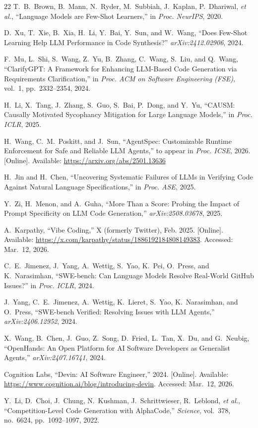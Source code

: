 \documentclass[conference]{IEEEtran}
\begin{document}
\begin{thebibliography}{22}
T.~B.~Brown, B.~Mann, N.~Ryder, M.~Subbiah, J.~Kaplan, P.~Dhariwal, \emph{et al.}, ``Language Models are Few-Shot Learners,'' in \emph{Proc. NeurIPS}, 2020.

D.~Xu, T.~Xie, B.~Xia, H.~Li, Y.~Bai, Y.~Sun, and W.~Wang, ``Does Few-Shot Learning Help LLM Performance in Code Synthesis?'' \emph{arXiv:2412.02906}, 2024.

F.~Mu, L.~Shi, S.~Wang, Z.~Yu, B.~Zhang, C.~Wang, S.~Liu, and Q.~Wang, ``ClarifyGPT: A Framework for Enhancing LLM-Based Code Generation via Requirements Clarification,'' in \emph{Proc. ACM on Software Engineering (FSE)}, vol.~1, pp.~2332--2354, 2024.

H.~Li, X.~Tang, J.~Zhang, S.~Guo, S.~Bai, P.~Dong, and Y.~Yu, ``CAUSM: Causally Motivated Sycophancy Mitigation for Large Language Models,'' in \emph{Proc. ICLR}, 2025.

H.~Wang, C.~M.~Poskitt, and J.~Sun, ``AgentSpec: Customizable Runtime Enforcement for Safe and Reliable LLM Agents,'' to appear in \emph{Proc. ICSE}, 2026. [Online]. Available: \url{https://arxiv.org/abs/2501.13636}

H.~Jin and H.~Chen, ``Uncovering Systematic Failures of LLMs in Verifying Code Against Natural Language Specifications,'' in \emph{Proc. ASE}, 2025.

Y.~Zi, H.~Menon, and A.~Guha, ``More Than a Score: Probing the Impact of Prompt Specificity on LLM Code Generation,'' \emph{arXiv:2508.03678}, 2025.

A.~Karpathy, ``Vibe Coding,'' X (formerly Twitter), Feb. 2025. [Online]. Available: \url{https://x.com/karpathy/status/1886192184808149383}. Accessed: Mar.~12, 2026.

C.~E.~Jimenez, J.~Yang, A.~Wettig, S.~Yao, K.~Pei, O.~Press, and K.~Narasimhan, ``SWE-bench: Can Language Models Resolve Real-World GitHub Issues?'' in \emph{Proc. ICLR}, 2024.

J.~Yang, C.~E.~Jimenez, A.~Wettig, K.~Lieret, S.~Yao, K.~Narasimhan, and O.~Press, ``SWE-bench Verified: Resolving Issues with LLM Agents,'' \emph{arXiv:2406.12952}, 2024.

X.~Wang, B.~Chen, J.~Guo, Z.~Song, D.~Fried, L.~Tan, X.~Du, and G.~Neubig, ``OpenHands: An Open Platform for AI Software Developers as Generalist Agents,'' \emph{arXiv:2407.16741}, 2024.

Cognition Labs, ``Devin: AI Software Engineer,'' 2024. [Online]. Available: \url{https://www.cognition.ai/blog/introducing-devin}. Accessed: Mar.~12, 2026.

Y.~Li, D.~Choi, J.~Chung, N.~Kushman, J.~Schrittwieser, R.~Leblond, \emph{et al.}, ``Competition-Level Code Generation with AlphaCode,'' \emph{Science}, vol.~378, no.~6624, pp.~1092--1097, 2022.

\end{thebibliography}
\end{document}
